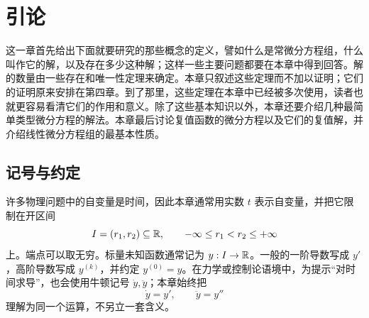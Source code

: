 \newtheorem{theorem}{定理}
\newtheorem{proposition}{命题}

\chapter{引论}

这一章首先给出下面就要研究的那些概念的定义，譬如什么是常微分方程组，什么叫作它的解，以及存在多少这种解；这样一些主要问题都要在本章中得到回答。解的数量由一些存在和唯一性定理来确定。本章只叙述这些定理而不加以证明；它们的证明原来安排在第四章。到了那里，这些定理在本章中已经被多次使用，读者也就更容易看清它们的作用和意义。除了这些基本知识以外，本章还要介绍几种最简单类型微分方程的解法。本章最后讨论复值函数的微分方程以及它们的复值解，并介绍线性微分方程组的最基本性质。

\section*{记号与约定}

许多物理问题中的自变量是时间，因此本章通常用实数 \(t\) 表示自变量，并把它限制在开区间
\[
 I=(r_1,r_2)\subseteq\mathbb R,
\qquad -\infty\le r_1<r_2\le+\infty
\]
上。端点可以取无穷。标量未知函数通常记为 \(y:I\to\mathbb R\)。一般的一阶导数写成 \(y'\)，高阶导数写成 \(y^{(k)}\)，并约定 \(y^{(0)}=y\)。在力学或控制论语境中，为提示“对时间求导”，也会使用牛顿记号 \(\dot y,\ddot y\)；本章始终把
\[
 \dot y=y',\qquad \ddot y=y''
\]
理解为同一个运算，不另立一套含义。

